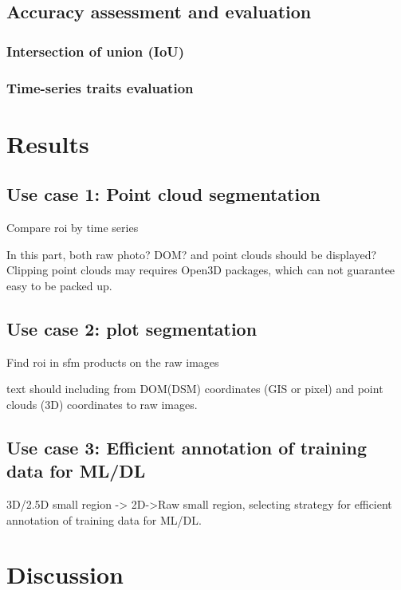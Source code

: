 \documentclass{configs/bmcart}
\begin{document}
\subsection*{Accuracy assessment and evaluation}

\subsubsection*{Intersection of union (IoU)}

\subsubsection*{Time-series traits evaluation}




\section*{Results}

\subsection*{Use case 1: Point cloud segmentation}
Compare \acrshort*{roi} by time series

In this part, both raw photo? DOM? and point clouds should be displayed? Clipping point clouds may requires Open3D packages, which can not guarantee easy to be packed up.

\subsection*{Use case 2: plot segmentation}

Find \acrshort*{roi} in \acrshort*{sfm} products on the raw images

text \cite{ma_calculation_2019, guo_illumination_2013}
should including from DOM(DSM) coordinates (GIS or pixel) and point clouds (3D) coordinates to raw images.

\subsection*{Use case 3: Efficient annotation of training data for ML/DL}
3D/2.5D small region -> 2D->Raw small region, selecting strategy for efficient annotation of training data for ML/DL.

\section*{Discussion}
\end{document}
